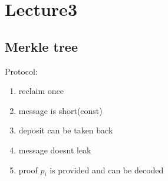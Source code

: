 \documentclass[../main.tex]{subfile}
\begin{document}
\section{Lecture3}
\subsection{Merkle tree}
Protocol:
\begin{enumerate}
	\item reclaim once
	\item message is short(const)
	\item deposit can be taken back
	\item message doesnt leak
	\item proof $p_i$ is provided and can be decoded
	
\end{enumerate}
\end{document}
